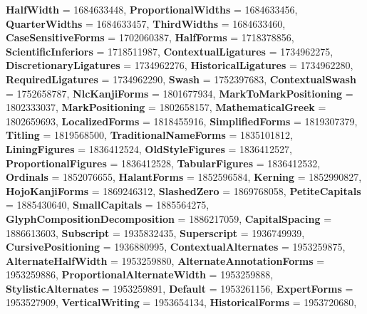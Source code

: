 \begin{DoxyCompactItemize}
{\bfseries Half\+Width} = 1684633448, 
{\bfseries Proportional\+Widths} = 1684633456, 
{\bfseries Quarter\+Widths} = 1684633457, 
\newline
{\bfseries Third\+Widths} = 1684633460, 
{\bfseries Case\+Sensitive\+Forms} = 1702060387, 
{\bfseries Half\+Forms} = 1718378856, 
{\bfseries Scientific\+Inferiors} = 1718511987, 
\newline
{\bfseries Contextual\+Ligatures} = 1734962275, 
{\bfseries Discretionary\+Ligatures} = 1734962276, 
{\bfseries Historical\+Ligatures} = 1734962280, 
{\bfseries Required\+Ligatures} = 1734962290, 
\newline
{\bfseries Swash} = 1752397683, 
{\bfseries Contextual\+Swash} = 1752658787, 
{\bfseries Nlc\+Kanji\+Forms} = 1801677934, 
{\bfseries Mark\+To\+Mark\+Positioning} = 1802333037, 
\newline
{\bfseries Mark\+Positioning} = 1802658157, 
{\bfseries Mathematical\+Greek} = 1802659693, 
{\bfseries Localized\+Forms} = 1818455916, 
{\bfseries Simplified\+Forms} = 1819307379, 
\newline
{\bfseries Titling} = 1819568500, 
{\bfseries Traditional\+Name\+Forms} = 1835101812, 
{\bfseries Lining\+Figures} = 1836412524, 
{\bfseries Old\+Style\+Figures} = 1836412527, 
\newline
{\bfseries Proportional\+Figures} = 1836412528, 
{\bfseries Tabular\+Figures} = 1836412532, 
{\bfseries Ordinals} = 1852076655, 
{\bfseries Halant\+Forms} = 1852596584, 
\newline
{\bfseries Kerning} = 1852990827, 
{\bfseries Hojo\+Kanji\+Forms} = 1869246312, 
{\bfseries Slashed\+Zero} = 1869768058, 
{\bfseries Petite\+Capitals} = 1885430640, 
\newline
{\bfseries Small\+Capitals} = 1885564275, 
{\bfseries Glyph\+Composition\+Decomposition} = 1886217059, 
{\bfseries Capital\+Spacing} = 1886613603, 
{\bfseries Subscript} = 1935832435, 
\newline
{\bfseries Superscript} = 1936749939, 
{\bfseries Cursive\+Positioning} = 1936880995, 
{\bfseries Contextual\+Alternates} = 1953259875, 
{\bfseries Alternate\+Half\+Width} = 1953259880, 
\newline
{\bfseries Alternate\+Annotation\+Forms} = 1953259886, 
{\bfseries Proportional\+Alternate\+Width} = 1953259888, 
{\bfseries Stylistic\+Alternates} = 1953259891, 
{\bfseries Default} = 1953261156, 
\newline
{\bfseries Expert\+Forms} = 1953527909, 
{\bfseries Vertical\+Writing} = 1953654134, 
{\bfseries Historical\+Forms} = 1953720680, 

\end{DoxyCompactItemize}
